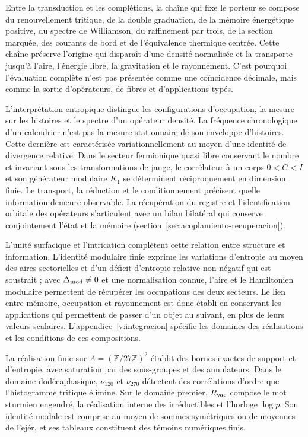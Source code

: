 Entre la transduction et les complétions, la chaîne qui fixe le porteur
se compose du renouvellement tritique, de la double graduation, de la mémoire énergétique positive,
du spectre de Williamson, du raffinement par trois, de la section marquée, des courants de
bord et de l’équivalence thermique centrée. Cette chaîne préserve
l’origine qui disparaît d’une densité normalisée et la transporte jusqu’à l’aire,
l’énergie libre, la gravitation et le rayonnement. C’est pourquoi l’évaluation complète n’est pas
présentée comme une coïncidence décimale, mais comme la sortie d’opérateurs, de fibres et
d’applications typés.

L’interprétation entropique distingue les configurations d’occupation,
la mesure sur les histoires et le spectre d’un opérateur densité.
La fréquence chronologique d’un calendrier n’est pas la mesure stationnaire
de son enveloppe d’histoires. Cette dernière est caractérisée
variationnellement au moyen d’une identité de divergence relative.
Dans le secteur fermionique quasi libre conservant le nombre et invariant
sous les transformations de jauge, le corrélateur à un corps \(0<C<I\)
et son générateur modulaire \(K_1\) se déterminent réciproquement en dimension
finie. Le transport, la
réduction et le conditionnement précisent quelle information demeure
observable. La récupération du registre et l’identification orbitale des
opérateurs s’articulent avec un bilan bilatéral qui conserve
conjointement l’état et la mémoire
(section~\ref{sec:acoplamiento-recuperacion}).

L’unité surfacique et l’intrication complètent cette relation entre
structure et information. L’identité modulaire finie exprime les
variations d’entropie au moyen des aires sectorielles et d’un déficit
d’entropie relative non négatif qui est soustrait ; avec \(\Delta_{\rm mod}\ne0\) et
une normalisation connue, l’aire et le Hamiltonien modulaire permettent de
récupérer les occupations des deux secteurs. Le lien entre mémoire, occupation et
rayonnement est donc établi en conservant les applications qui permettent de
passer d’un objet au suivant, en plus de leurs valeurs scalaires.
L’appendice~\ref{v:integracion} spécifie les domaines des
réalisations et les conditions de ces compositions.

La réalisation finie sur \(\Lambda=(\mathbb Z/27\mathbb Z)^2\)
établit des bornes exactes de support et d’entropie, avec saturation par
des sous-groupes et des annulateurs. Dans le domaine dodécaphasique, \(\nu_{120}\) et
\(\nu_{270}\) détectent des corrélations d’ordre que l’histogramme tritique
élimine. Sur le domaine premier, \(R_{\rm vac}\) compose le mot
sturmien engendré, la réalisation interne des irréductibles et l’horloge
\(\log p\). Son identité modale est comprise au moyen de sommes symétriques ou de
moyennes de Fejér, et ses tableaux constituent des témoins numériques finis.

